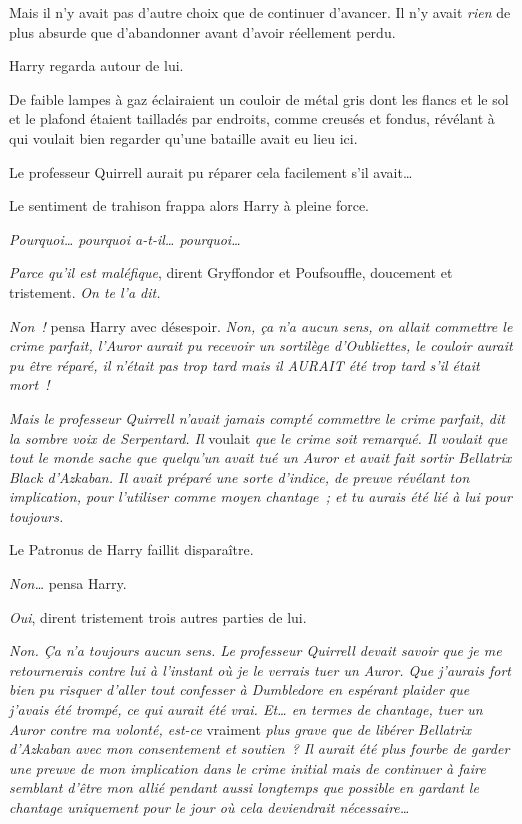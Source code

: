 Mais il n'y avait pas d'autre choix que de continuer d'avancer. Il n'y avait \emph{rien} de plus absurde que d'abandonner avant d'avoir réellement perdu.

Harry regarda autour de lui.

De faible lampes à gaz éclairaient un couloir de métal gris dont les flancs et le sol et le plafond étaient tailladés par endroits, comme creusés et fondus, révélant à qui voulait bien regarder qu'une bataille avait eu lieu ici.

Le professeur Quirrell aurait pu réparer cela facilement s'il avait…

Le sentiment de trahison frappa alors Harry à pleine force.

\emph{Pourquoi… pourquoi a-t-il… pourquoi…}

\emph{Parce qu'il est maléfique}, dirent Gryffondor et Poufsouffle, doucement et tristement. \emph{On te l'a dit.}

\emph{Non~!} pensa Harry avec désespoir. \emph{Non, ça n'a aucun sens, on allait commettre le crime parfait, l'Auror aurait pu recevoir un sortilège d'Oubliettes, le couloir aurait pu être réparé, il n'était pas trop tard mais il AURAIT été trop tard s'il était mort~!}

\emph{Mais le professeur Quirrell n'avait jamais compté commettre le crime parfait, dit la sombre voix de Serpentard. Il} voulait \emph{que le crime soit remarqué. Il voulait que tout le monde sache que quelqu'un avait tué un Auror et avait fait sortir Bellatrix Black d'Azkaban. Il avait préparé une sorte d'indice, de preuve révélant ton implication, pour l'utiliser comme moyen chantage~; et tu aurais été lié à lui pour toujours.}

Le Patronus de Harry faillit disparaître.

\emph{Non…} pensa Harry.

\emph{Oui}, dirent tristement trois autres parties de lui.

\emph{Non. Ça n'a toujours aucun sens. Le professeur Quirrell devait savoir que je me retournerais contre lui à l'instant où je le verrais tuer un Auror. Que j'aurais fort bien pu risquer d'aller tout confesser à Dumbledore en espérant plaider que j'avais été trompé, ce qui aurait été vrai. Et… en termes de chantage, tuer un Auror contre ma volonté, est-ce} vraiment \emph{plus grave que de libérer Bellatrix d'Azkaban avec mon consentement et soutien~? Il aurait été plus fourbe de garder une preuve de mon implication dans le crime initial mais de continuer à faire semblant d'être mon allié pendant aussi longtemps que possible en gardant le chantage uniquement pour le jour où cela deviendrait nécessaire…}

